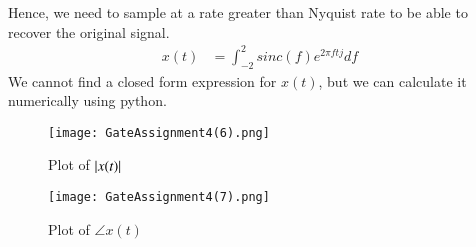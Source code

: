 \documentclass[journal,12pt,twocolumn]{IEEEtran}
\begin{document}
Hence, we need to sample at a rate greater than Nyquist rate to be able to recover the original signal. 
\begin{align}
    x(t)&=\displaystyle\int_{-2}^{2}sinc(f)e^{2\pi ftj}df
\end{align}
We cannot find a closed form expression for $x(t)$, but we can calculate it numerically using python.
\begin{figure}[!h]
 \centering
 \texttt{[image: GateAssignment4(6).png]}
 \caption{Plot of $\vert x(t)\vert$}
 \label{plot}
\end{figure}
\begin{figure}[!h]
 \texttt{[image: GateAssignment4(7).png]}
 \caption{Plot of $\angle x(t)$}
 \label{plot}
\end{figure}
\end{document}
